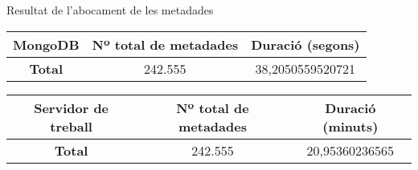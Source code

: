 \begin{frame}{Resultat de l'abocament de les metadades}
    \begin{table}[!t]
        \label{tab:table2}
        \centering
        \begin{tabular}{|c|c|c|}
            \hline
            MongoDB & Nº total de metadades & Duració (segons)\\
            \hline
            \textbf{Total} & 242.555 & 38,2050559520721\\
            \hline
        \end{tabular}
    \end{table}

    \begin{table}[!t]
        \label{tab:table3}
        \centering
        \begin{tabular}{|c|c|c|}
            \hline
            Servidor de treball & Nº total de metadades & Duració (minuts)\\
            \hline
            \textbf{Total} & 242.555 & 20,95360236565\\
            \hline
        \end{tabular}
    \end{table}
\end{frame}